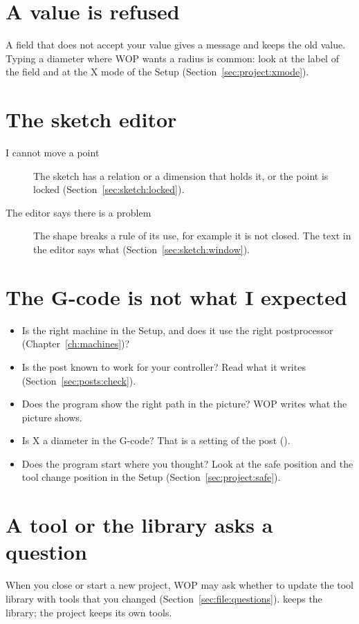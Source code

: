 \section{A value is refused}
A field that does not accept your value gives a message and keeps the old value. Typing a diameter where WOP wants a radius is common: look at the label of the field and at the X mode of the Setup (Section~\ref{sec:project:xmode}).

\section{The sketch editor}
\begin{description}
\item[I cannot move a point] The sketch has a relation or a dimension that holds it, or the point is locked (Section~\ref{sec:sketch:locked}).
\item[The editor says there is a problem] The shape breaks a rule of its use, for example it is not closed. The text in the editor says what (Section~\ref{sec:sketch:window}).
\end{description}

\section{The G-code is not what I expected}
\begin{itemize}
  \item Is the right machine in the Setup, and does it use the right postprocessor (Chapter~\ref{ch:machines})?
  \item Is the post known to work for your controller? Read what it writes (Section~\ref{sec:posts:check}).
  \item Does the program show the right path in the picture? WOP writes what the picture shows.
  \item Is X a diameter in the G-code? That is a setting of the post ().
  \item Does the program start where you thought? Look at the safe position and the tool change position in the Setup (Section~\ref{sec:project:safe}).
\end{itemize}

\section{A tool or the library asks a question}
When you close or start a new project, WOP may ask whether to update the tool library with tools that you changed (Section~\ref{sec:file:questions}).  keeps the library; the project keeps its own tools.
